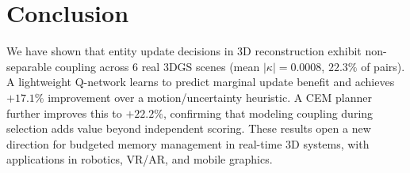 \documentclass[10pt,twocolumn]{article}
\begin{document}
\section{Conclusion}

We have shown that entity update decisions in 3D reconstruction exhibit non-separable coupling across 6 real 3DGS scenes (mean $|\kappa|=0.0008$, $22.3\%$ of pairs). A lightweight Q-network learns to predict marginal update benefit and achieves $+17.1\%$ improvement over a motion/uncertainty heuristic. A CEM planner further improves this to $+22.2\%$, confirming that modeling coupling during selection adds value beyond independent scoring. These results open a new direction for budgeted memory management in real-time 3D systems, with applications in robotics, VR/AR, and mobile graphics.



\end{document}
